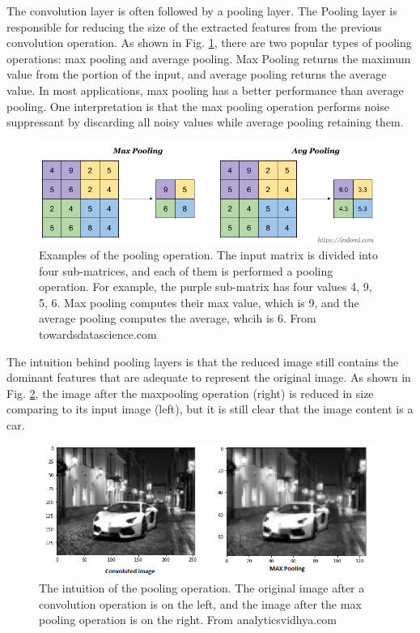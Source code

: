 The convolution layer is often followed by a pooling layer. The Pooling layer is responsible for reducing the size of the extracted features from the previous convolution operation. As shown in Fig. \ref{fig_pooling}, there are two popular types of pooling operations: max pooling and average pooling. Max Pooling returns the maximum value from the portion of the input, and average pooling returns the average value. In most applications, max pooling has a better performance than average pooling. One interpretation is that the max pooling operation performs noise suppressant by discarding all noisy values while average pooling retaining them.
\begin{figure}[h!]
\begin{center}
\includegraphics[width = 13cm]{img/pooling.png}
\caption[Examples of the pooling operation]{Examples of the pooling operation. The input matrix is divided into four sub-matrices, and each of them is performed a pooling operation. For example, the purple sub-matrix has four values 4, 9, 5, 6. Max pooling computes their max value, which is 9, and the average pooling computes the average, whcih is 6. From towardsdatascience.com \label{fig_pooling}}
\end{center}
\end{figure}

The intuition behind pooling layers is that the reduced image still contains the dominant features that are adequate to represent the original image. As shown in Fig. \ref{fig_pooling_blurry}, the image after the maxpooling operation (right) is reduced in size comparing to its input image (left), but it is still clear that the image content is a car. 
\begin{figure}[h!]
\begin{center}
\includegraphics[width = 13cm]{img/pooling_blurry.png}
\caption[The intuition of the pooling operation]{The intuition of the pooling operation. The original image after a convolution operation is on the left, and the image after the max pooling operation is on the right. From analyticsvidhya.com \label{fig_pooling_blurry}}
\end{center}
\end{figure}

